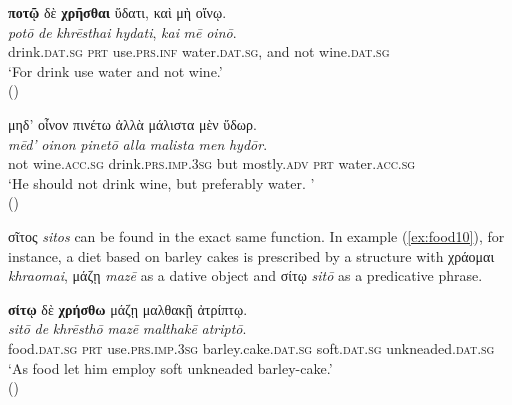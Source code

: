 \documentclass[output=paper,colorlinks,citecolor=brown]{langscibook}
\begin{document}
\begin{exe}
\ex\label{ex:food8}
\glll \textbf{ποτῷ} δὲ \textbf{χρῆσθαι} ὕδατι, καὶ μὴ οἴνῳ.\\ 
\textit{potō} \textit{de} \textit{khrēsthai} \textit{hydati}, \textit{kai} \textit{mē} \textit{oinō}.\\
drink.\textsc{dat.sg} \textsc{prt} use.\textsc{prs.inf} water.\textsc{dat.sg}, and not wine.\textsc{dat.sg} \\
\glt ‘For drink use water and not wine.' \\
\hspace*{\fill}()
\end{exe}

\begin{exe}
\ex\label{ex:food9}
\glll μηδ’ οἶνον πινέτω ἀλλὰ μάλιστα μὲν ὕδωρ. \\ 
\textit{mēd’} \textit{oinon} \textit{pinetō} \textit{alla} \textit{malista} \textit{men} \textit{hydōr}.\\
not wine.\textsc{acc.sg} drink.\textsc{prs.imp.3sg} but mostly.\textsc{adv} \textsc{prt} water.\textsc{acc.sg} \\
\glt ‘He should not drink wine, but preferably water. ' \\
\hspace*{\fill}()
\end{exe}

σῖτος \textit{sitos} can be found in the exact same function. In example (\ref{ex:food10}), for instance, a diet based on barley cakes is prescribed by a structure with χράομαι \textit{khraomai}, μάζῃ \textit{mazē} as a dative object and σίτῳ \textit{sitō} as a predicative phrase.

\begin{exe}
\ex\label{ex:food10}
\glll \textbf{σίτῳ} δὲ \textbf{χρήσθω} μάζῃ μαλθακῇ ἀτρίπτῳ.\\ 
\textit{sitō} \textit{de} \textit{khrēsthō} \textit{mazē} \textit{malthakē} \textit{atriptō}.\\
food.\textsc{dat.sg} \textsc{prt} use.\textsc{prs.imp.3sg} barley.cake.\textsc{dat.sg} soft.\textsc{dat.sg} unkneaded.\textsc{dat.sg} \\
\glt ‘As food let him employ soft unkneaded barley-cake.' \\
\hspace*{\fill}()
\end{exe}
\end{document}
